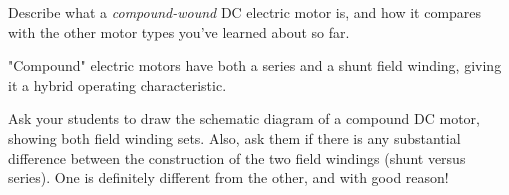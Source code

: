 

Describe what a {\it compound-wound} DC electric motor is, and how it compares with the other motor types you've learned about so far.







"Compound" electric motors have both a series and a shunt field winding, giving it a hybrid operating characteristic.







Ask your students to draw the schematic diagram of a compound DC motor, showing both field winding sets.  Also, ask them if there is any substantial difference between the construction of the two field windings (shunt versus series).  One is definitely different from the other, and with good reason!



